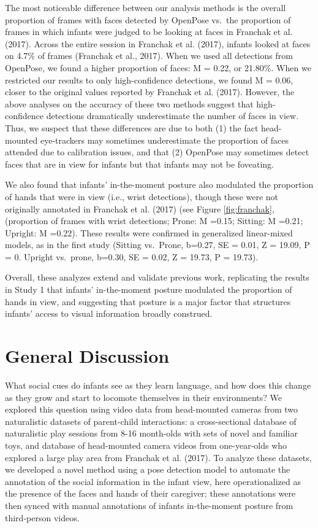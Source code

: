 \documentclass[english,man]{apa6}
\begin{document}
The most noticeable difference between our analysis methods is the
overall proportion of frames with faces detected by OpenPose vs.~the
proportion of frames in which infants were judged to be looking at faces
in Franchak et al. (2017). Across the entire session in Franchak et al.
(2017), infants looked at faces on 4.7\% of frames (Franchak et al.,
2017). When we used all detections from OpenPose, we found a higher
proportion of faces: M = 0.22, or 21.80\%. When we restricted our
results to only high-confidence detections, we found M = 0.06, closer to
the original values reported by Franchak et al. (2017). However, the
above analyses on the accuracy of these two methods suggest that
high-confidence detections dramatically underestimate the number of
faces in view. Thus, we suspect that these differences are due to both
(1) the fact head-mounted eye-trackers may sometimes underestimate the
proportion of faces attended due to calibration issues, and that (2)
OpenPose may sometimes detect faces that are in view for infants but
that infants may not be foveating.

We also found that infants' in-the-moment posture also modulated the
proportion of hands that were in view (i.e., wrist detections), though
these were not originally annotated in Franchak et al. (2017) (see
Figure \ref{fig:franchak}, (proportion of frames with wrist detections;
Prone: M =0.15; Sitting: M =0.21; Upright: M =0.22). These results were
confirmed in generalized linear-mixed models, as in the first study
(Sitting vs.~Prone, b=0.27, SE = 0.01, Z = 19.09, P = 0. Upright
vs.~prone, b=0.30, SE = 0.02, Z = 19.73, P = 19.73).

Overall, these analyzes extend and validate previous work, replicating
the results in Study 1 that infants' in-the-moment posture modulated the
proportion of hands in view, and suggesting that posture is a major
factor that structures infants' access to visual information broadly
construed.

\section{General Discussion}\label{general-discussion}

What social cues do infants see as they learn language, and how does
this change as they grow and start to locomote themselves in their
environments? We explored this question using video data from
head-mounted cameras from two naturalistic datasets of parent-child
interactions: a cross-sectional database of naturalistic play sessions
from 8-16 month-olds with sets of novel and familiar toys, and database
of head-mounted camera videos from one-year-olds who explored a large
play area from Franchak et al. (2017). To analyze these datasets, we
developed a novel method using a pose detection model to automate the
annotation of the social information in the infant view, here
operationalized as the presence of the faces and hands of their
caregiver; these annotations were then synced with manual annotations of
infants in-the-moment posture from third-person videos.
\end{document}
